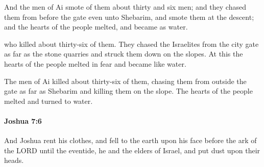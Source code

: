 			\begin{versebox}
					\item[BHS] 
					\item[ASV] And the men of Ai smote of them about thirty and six men; and they chased them from before the gate even unto Shebarim, and smote them at the descent; and the hearts of the people melted, and became as water.
					\item[NIV] who killed about thirty-six of them. They chased the Israelites from the city gate as far as the stone quarries and struck them down on the slopes. At this the hearts of the people melted in fear and became like water.
					\item[NRSV] The men of Ai killed about thirty-six of them, chasing them from outside the gate as far as Shebarim and killing them on the slope. The hearts of the people melted and turned to water.
			\end{versebox}

		\paragraph{Joshua 7:6} %
			\label{JOSHUA-7-6}

			And Joshua rent his clothes, and fell to the earth upon his face before the ark of the LORD until the eventide, he and the elders of Israel, and put dust upon their heads.

